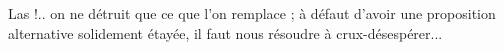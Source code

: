 \documentclass[12pt]{book}%
\newcommand{\italique}[1]{\textit{#1}}%
\newcommand{\nieme}[1]{#1\italique{e}}%
\newcommand{\Mon}[0]{ M }%
\newcommand{\latin}[1]{{\policeLat #1}}%
\newcommand{\marqueur}[1]{\textsuperscript{#1}}%
\newenvironment{groupe}{%
\pstart%
\ledgroup%
}{%
\pend %
}%
\begin{document}
\begin{pages}
\begin{Leftside}
\begin{groupe}
{{Las !.. on ne détruit que ce que l'on remplace ; à défaut d'avoir une proposition alternative solidement étayée, il faut nous résoudre à \latin{crux}-désespérer...
%
}}
\end{groupe}
\end{Leftside}
\end{pages}
\end{document}
